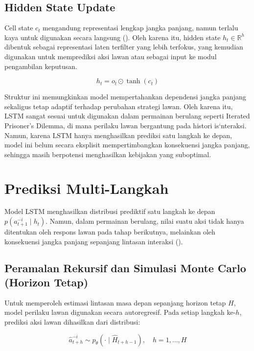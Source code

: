 \subsection{Hidden State Update}

Cell state $c_t$ mengandung representasi lengkap jangka panjang, namun terlalu kaya untuk digunakan secara langsung (\cite{hochreiter_long_1997}). Oleh karena itu, hidden state $h_t \in \mathbb{R}^h$ dibentuk sebagai representasi laten terfilter yang lebih terfokus, yang kemudian digunakan untuk memprediksi aksi lawan atau sebagai input ke modul pengambilan keputusan.

\begin{equation}
h_t = o_t \odot \tanh(c_t)
\end{equation}

Struktur ini memungkinkan model mempertahankan dependensi jangka panjang sekaligus tetap adaptif terhadap perubahan strategi lawan. Oleh karena itu, LSTM sangat sesuai untuk digunakan dalam permainan berulang seperti Iterated Prisoner's Dilemma, di mana perilaku lawan bergantung pada histori is`nteraksi. Namun, karena LSTM hanya menghasilkan prediksi satu langkah ke depan, model ini belum secara eksplisit mempertimbangkan konsekuensi jangka panjang, sehingga masih berpotensi menghasilkan kebijakan yang suboptimal.

\section{Prediksi Multi-Langkah}

Model LSTM menghasilkan distribusi prediktif satu langkah ke depan
$p(a_{t+1}^{-i} \mid h_t)$.
Namun, dalam permainan berulang,
nilai suatu aksi tidak hanya ditentukan oleh respons lawan pada tahap berikutnya,
melainkan oleh konsekuensi jangka panjang sepanjang lintasan interaksi (\cite{nashed_survey_2022}).

\subsection{Peramalan Rekursif dan Simulasi Monte Carlo (Horizon Tetap)}

Untuk memperoleh estimasi lintasan masa depan sepanjang horizon tetap $H$, 
model perilaku lawan digunakan secara autoregresif. 
Pada setiap langkah ke-$h$, prediksi aksi lawan dihasilkan dari distribusi:

\[
\hat{a}_{t+h}^{-i}
\sim
p_\theta(\cdot \mid \hat{H}_{t+h-1}),
\quad h = 1, \dots, H
\]

